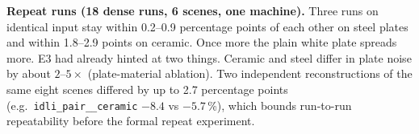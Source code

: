 \textbf{Repeat runs (18 dense runs, 6 scenes, one machine).} Three runs on
identical input stay within 0.2--0.9 percentage points of each other on steel
plates and within 1.8--2.9 points on ceramic. Once more the plain white plate
spreads more.
 E3 had already hinted at two things. Ceramic and steel differ in plate noise by about $2$--$5\times$
(plate-material ablation). Two independent reconstructions of the same eight
scenes differed by up to 2.7 percentage points (e.g.\ \texttt{idli\_pair\_\_ceramic}
$-8.4$ vs $-5.7$\,\%), which bounds run-to-run repeatability before the formal
repeat experiment.
